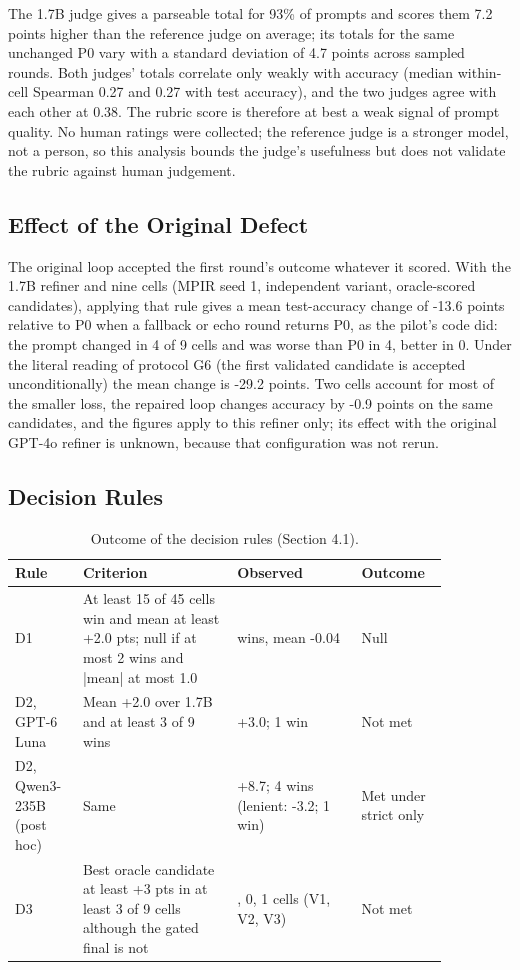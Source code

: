 \documentclass{ieeeaccess}
\begin{document}
The 1.7B judge gives a parseable total for 93\% of prompts and scores them 7.2 points higher than the reference judge on average; its totals for the same unchanged P0 vary with a standard deviation of 4.7 points across sampled rounds. Both judges' totals correlate only weakly with accuracy (median within-cell Spearman 0.27 and 0.27 with test accuracy), and the two judges agree with each other at 0.38. The rubric score is therefore at best a weak signal of prompt quality. No human ratings were collected; the reference judge is a stronger model, not a person, so this analysis bounds the judge's usefulness but does not validate the rubric against human judgement.

\subsection{Effect of the Original Defect}

The original loop accepted the first round's outcome whatever it scored. With the 1.7B refiner and nine cells (MPIR seed 1, independent variant, oracle-scored candidates), applying that rule gives a mean test-accuracy change of -13.6 points relative to P0 when a fallback or echo round returns P0, as the pilot's code did: the prompt changed in 4 of 9 cells and was worse than P0 in 4, better in 0. Under the literal reading of protocol G6 (the first validated candidate is accepted unconditionally) the mean change is -29.2 points. Two cells account for most of the smaller loss, the repaired loop changes accuracy by -0.9 points on the same candidates, and the figures apply to this refiner only; its effect with the original GPT-4o refiner is unknown, because that configuration was not rerun.

\subsection{Decision Rules}

\begin{table}[htbp]
\centering
\small
\caption{Outcome of the decision rules (Section 4.1).}
\begin{tabular}{>{\raggedright\arraybackslash}p{0.129\linewidth}>{\raggedright\arraybackslash}p{0.318\linewidth}>{\raggedright\arraybackslash}p{0.258\linewidth}>{\raggedright\arraybackslash}p{0.155\linewidth}}
\toprule
\textbf{Rule} & \textbf{Criterion} & \textbf{Observed} & \textbf{Outcome} \\
\midrule
D1 & At least 15 of 45 cells win and mean at least +2.0 pts; null if at most 2 wins and |mean| at most 1.0 & 0 wins, mean -0.04 & Null \\
D2, GPT-6 Luna & Mean +2.0 over 1.7B and at least 3 of 9 wins & +3.0; 1 win & Not met \\
D2, Qwen3-235B (post hoc) & Same & +8.7; 4 wins (lenient: -3.2; 1 win) & Met under strict only \\
D3 & Best oracle candidate at least +3 pts in at least 3 of 9 cells although the gated final is not & 0, 0, 1 cells (V1, V2, V3) & Not met \\
\bottomrule
\end{tabular}
\end{table}
\end{document}
